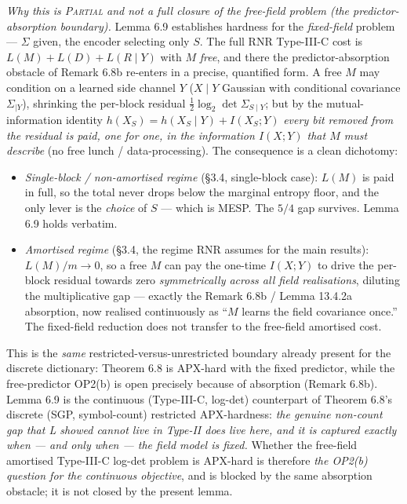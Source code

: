 \documentclass[
]{article}
\begin{document}
\emph{Why this is \textsc{Partial} and not a full closure of the free-field
problem (the predictor-absorption boundary).} Lemma 6.9 establishes
hardness for the \emph{fixed-field} problem --- $\Sigma$ given, the encoder
selecting only $S$. The full RNR Type-III-C cost is $L(M)+L(D)+L(R\mid Y)$
with $M$ \emph{free}, and there the predictor-absorption obstacle of Remark
6.8b re-enters in a precise, quantified form. A free $M$ may condition on a
learned side channel $Y$ ($X\mid Y$ Gaussian with conditional covariance
$\Sigma_{\mid Y}$), shrinking the per-block residual $\tfrac12\log_2\det
\Sigma_{S\mid Y}$; but by the mutual-information identity $h(X_S)=h(X_S\mid
Y)+I(X_S;Y)$ \emph{every bit removed from the residual is paid, one for one,
in the information $I(X;Y)$ that $M$ must describe} (no free lunch /
data-processing). The consequence is a clean dichotomy:
\begin{itemize}
\item \emph{Single-block / non-amortised regime} (\S 3.4, single-block
case): $L(M)$ is paid in full, so the total never drops below the marginal
entropy floor, and the only lever is the \emph{choice} of $S$ --- which is
MESP. The $5/4$ gap survives. Lemma 6.9 holds verbatim.
\item \emph{Amortised regime} (\S 3.4, the regime RNR assumes for the main
results): $L(M)/m\to0$, so a free $M$ can pay the one-time $I(X;Y)$ to drive
the per-block residual towards zero \emph{symmetrically across all field
realisations}, diluting the multiplicative gap --- exactly the Remark 6.8b /
Lemma 13.4.2a absorption, now realised continuously as ``$M$ learns the
field covariance once.'' The fixed-field reduction does not transfer to the
free-field amortised cost.
\end{itemize}
This is the \emph{same} restricted-versus-unrestricted boundary already
present for the discrete dictionary: Theorem 6.8 is APX-hard with the fixed
predictor, while the free-predictor OP2(b) is open precisely because of
absorption (Remark 6.8b). Lemma 6.9 is the continuous (Type-III-C, log-det)
counterpart of Theorem 6.8's discrete (SGP, symbol-count) restricted
APX-hardness: \emph{the genuine non-count gap that L showed cannot live in
Type-II does live here, and it is captured exactly when --- and only when ---
the field model is fixed.} Whether the free-field amortised Type-III-C
log-det problem is APX-hard is therefore \emph{the OP2(b) question for the
continuous objective}, and is blocked by the same absorption obstacle; it is
not closed by the present lemma.
\end{document}
